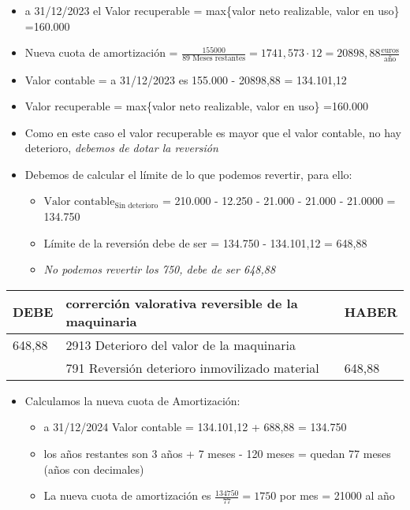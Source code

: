 \documentclass[a4paper,12pt]{article}
\newcommand{\fec}{31/12/}
\newcommand{\valorrecuperable}{Valor recuperable = max\{valor neto realizable, valor en uso\} =}
\newcommand{\DVM}{2913 Deterioro del valor de la maquinaria }
\newcommand{\RDIM}{791 Reversión deterioro inmovilizado material}
\newcommand{\VC}{Valor contable = }
\begin{document}
\begin{itemize}
    \item a \fec2023 el \valorrecuperable 160.000
    \item Nueva cuota de amortización = $\frac{155000}{89 \text{ Meses restantes}} = 1741,573 \cdot 12 = 20898,88 \frac{\text{euros}}{\text{año}} $
    \item \VC a \fec2023 es 155.000 - 20898,88 = 134.101,12
    \item \valorrecuperable 160.000
    \item Como en este caso el valor recuperable es mayor que el valor contable, no hay deterioro, \textit{debemos de dotar la reversión}
    \item Debemos de calcular el límite de lo que podemos revertir, para ello:
    \begin{itemize}
        \item $\text{Valor contable}_{\text{Sin deterioro}}$ = 210.000 - 12.250 - 21.000 - 21.000 - 21.0000 = 134.750
        \item Límite de la reversión debe de ser = 134.750 - 134.101,12 = 648,88
        \item \textit{No podemos revertir los 750, debe de ser 648,88} 
    \end{itemize}
\end{itemize}

\begin{table}[H]
    \centering
    \begin{tabular}{|p{3cm}|p{6cm}|p{3cm}|}
    \hline
    \textbf{DEBE} & \textbf{correrción valorativa reversible de la maquinaria} & \textbf{HABER} \\
    \hline
    648,88 & \DVM  & \\
    \hline
    & \RDIM& 648,88\\
    \hline
    \end{tabular}
\end{table}

\begin{itemize}
    \item Calculamos la nueva cuota de Amortización:
    \begin{itemize}
        \item a \fec2024 \VC 134.101,12 + 688,88 = 134.750
        \item los años restantes son 3 años + 7 meses - 120 meses = quedan 77 meses (años con decimales)
        \item La nueva cuota de amortización es $\frac{134750}{77} = 1750$ por mes = 21000 al año
    \end{itemize}
\end{itemize}
\end{document}
